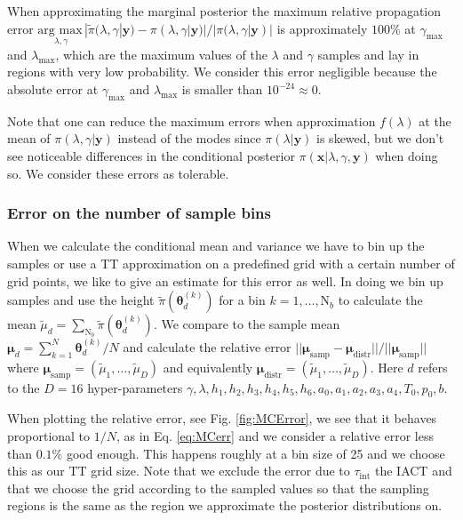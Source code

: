 When approximating the marginal posterior the maximum relative propagation error $\underset{\lambda , \gamma}{\text{arg max}\,}|\tilde{\pi}(\lambda,\gamma|\bm{y}) - \pi(\lambda,\gamma|\bm{y}) |/ |\pi(\lambda,\gamma|\bm{y})|$ is approximately $100\%$ at $\gamma_{\text{max}}$ and $\lambda_{\text{max}}$, which are the maximum values of the $\lambda$ and $\gamma$ samples and lay in regions with very low probability.
We consider this error negligible because the absolute error at $\gamma_{\text{max}}$ and $\lambda_{\text{max}}$ is smaller than $10^{-24} \approx 0$.


Note that one can reduce the maximum errors when approximation $f(\lambda)$ at the mean of $\pi(\lambda,\gamma|\bm{y})$ instead of the modes since $\pi(\lambda | \bm{y})$ is skewed, but we don't see noticeable differences in the conditional posterior $\pi(\bm{x}|\lambda,\gamma,\bm{y})$ when doing so.
We consider these errors as tolerable.

\subsubsection{Error on the number of sample bins }
When we calculate the conditional mean and variance we have to bin up the samples or use a TT approximation on a predefined grid with a certain number of grid points, we like to give an estimate for this error as well.
In doing we bin up samples and use the height $\tilde{\pi}(\bm{\theta}^{(k)}_d)$ for a bin $k = 1, \dots, \text{N}_b$ to calculate the mean $\tilde{\mu}_d = \sum_{\text{N}_b} \tilde{\pi}(\bm{\theta}^{(k)}_d) $.
We compare to the sample mean $\bm{\mu}_d = \sum_{k=1}^N \bm{\theta}^{(k)}_d/N$ and calculate the relative error $||\bm{\mu}_{\text{samp}} -\bm{\mu}_{\text{distr}} ||/ || \bm{\mu}_{\text{samp}} ||$
where $\bm{\mu}_{\text{samp}} =(\tilde{\mu}_1, \dots , \tilde{\mu}_D) $ and equivalently $\bm{\mu}_{\text{distr}} =(\tilde{\mu}_1, \dots , \tilde{\mu}_D) $.
Here $d$ refers to the $D = 16$ hyper-parameters $\gamma, \lambda, h_1, h_2, h_3, h_4, h_5, h_6, a_0, a_1, a_2, a_3, a_4, T_0, p_0, b$.

When plotting the relative error, see Fig. \ref{fig:MCError}, we see that it behaves proportional to $1/N$, as in Eq. \ref{eq:MCerr} and we consider a relative error less than $0.1\%$ good enough.
This happens roughly at a bin size of 25 and we choose this as our TT grid size.
Note that we exclude the error due to $\tau_{\text{int}}$ the IACT and that we choose the grid according to the sampled values so that the sampling regions is the same as the region we approximate the posterior distributions on.

